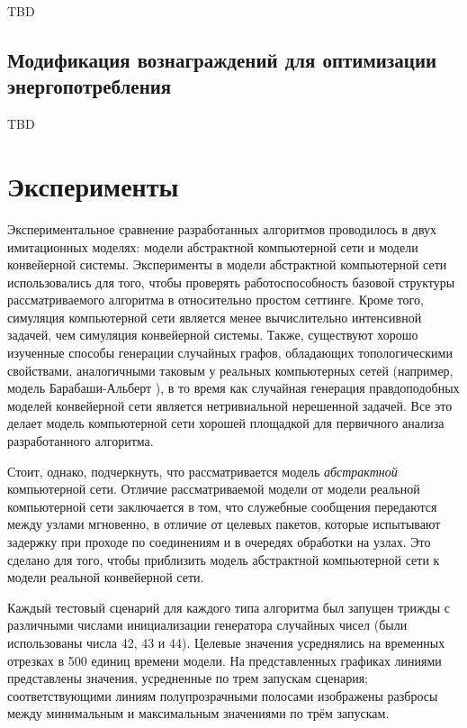 \documentclass[specification,annotation,times]{itmo-student-thesis}
\theoremstyle{definition}
\begin{document}
TBD

\section{Модификация вознаграждений для оптимизации энергопотребления}

\chapterconclusion

TBD

\chapter{Эксперименты}\label{experiments}

Экспериментальное сравнение разработанных алгоритмов проводилось в двух
имитационных моделях: модели абстрактной компьютерной сети и модели конвейерной
системы. Эксперименты в модели абстрактной компьютерной сети использовались для
того, чтобы проверять работоспособность базовой структуры рассматриваемого
алгоритма в относительно простом сеттинге. Кроме того, симуляция компьютерной
сети является менее вычислительно интенсивной задачей, чем симуляция конвейерной
системы. Также, существуют хорошо изученные способы генерации случайных графов,
обладающих топологическими свойствами, аналогичными таковым у реальных
компьютерных сетей (например, модель Барабаши-Альберт
\cite{albert2002statistical}), в то время как случайная генерация правдоподобных
моделей конвейерной сети является нетривиальной нерешенной задачей. Все это
делает модель компьютерной сети хорошей площадкой для первичного анализа
разработанного алгоритма.

Стоит, однако, подчеркнуть, что рассматривается модель \textit{абстрактной}
компьютерной сети. Отличие рассматриваемой модели от модели реальной
компьютерной сети заключается в том, что служебные сообщения передаются между
узлами мгновенно, в отличие от целевых пакетов, которые испытывают задержку при
проходе по соединениям и в очередях обработки на узлах. Это сделано для того,
чтобы приблизить модель абстрактной компьютерной сети к модели реальной
конвейерной сети.

Каждый тестовый сценарий для каждого типа алгоритма был запущен трижды с
различными числами инициализации генератора случайных чисел (были использованы
числа 42, 43 и 44). Целевые значения усреднялись на временных отрезках в 500
единиц времени модели. На представленных графиках линиями представлены значения,
усредненные по трем запускам сценария; соответствующими линиям полупрозрачными
полосами изображены разбросы между минимальным и максимальным значениями по трём
запускам.
\end{document}
